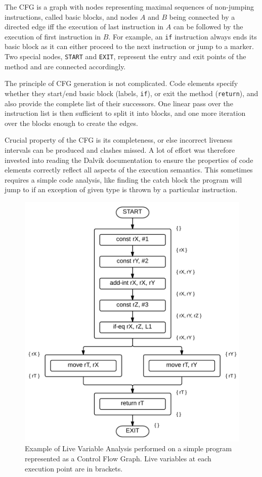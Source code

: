 \documentclass[12pt,twoside,notitlepage]{report}
\begin{document}
The CFG is a graph with nodes representing maximal sequences of non-jumping instructions, called basic blocks, and nodes $A$ and $B$ being connected by a directed edge iff the execution of last instruction in $A$ can be followed by the execution of first instruction in $B$. For example, an \verb$if$ instruction always ends its basic block as it can either proceed to the next instruction or jump to a marker. Two special nodes, \verb$START$ and \verb$EXIT$, represent the entry and exit points of the method and are connected accordingly.

The principle of CFG generation is not complicated. Code elements specify whether they start/end basic block (labels, \verb$if$), or exit the method (\verb$return$), and also provide the complete list of their successors. One linear pass over the instruction list is then sufficient to split it into blocks, and one more iteration over the blocks enough to create the edges.

Crucial property of the CFG is its completeness, or else incorrect liveness intervals can be produced and clashes missed. A lot of effort was therefore invested into reading the Dalvik documentation to ensure the properties of code elements correctly reflect all aspects of the execution semantics. This sometimes requires a simple code analysis, like finding the catch block the program will jump to if an exception of given type is thrown by a particular instruction. 

\begin{figure}
	\centerline{	
		\includegraphics[height=0.5\textheight]{figs/fig_implementation_lva.png}
	}
	\caption{Example of Live Variable Analysis performed on a simple program represented as a Control Flow Graph. Live variables at each execution point are in brackets.}
	\label{fig:Implementation_LVA}
\end{figure}
\end{document}
